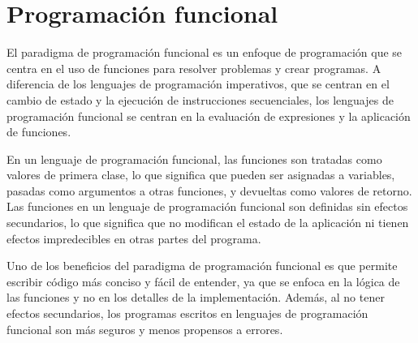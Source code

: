 \documentclass[executivepaper]{article}
\begin{document}
\section{Programación funcional}
El paradigma de programación funcional es un enfoque de programación que se centra en el uso de funciones para resolver problemas y crear programas. A diferencia de los lenguajes de programación imperativos, que se centran en el cambio de estado y la ejecución de instrucciones secuenciales, los lenguajes de programación funcional se centran en la evaluación de expresiones y la aplicación de funciones.

En un lenguaje de programación funcional, las funciones son tratadas como valores de primera clase, lo que significa que pueden ser asignadas a variables, pasadas como argumentos a otras funciones, y devueltas como valores de retorno. Las funciones en un lenguaje de programación funcional son definidas sin efectos secundarios, lo que significa que no modifican el estado de la aplicación ni tienen efectos impredecibles en otras partes del programa.

Uno de los beneficios del paradigma de programación funcional es que permite escribir código más conciso y fácil de entender, ya que se enfoca en la lógica de las funciones y no en los detalles de la implementación. Además, al no tener efectos secundarios, los programas escritos en lenguajes de programación funcional son más seguros y menos propensos a errores.
\end{document}
